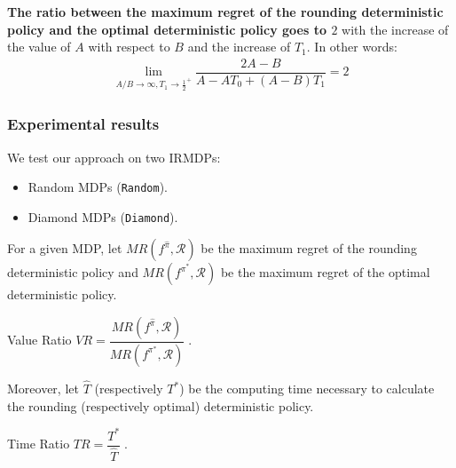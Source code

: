 \documentclass{beamer}
\begin{document}
\begin{frame}
\begin{columns}
\begin{column}{0.5\textwidth}
\begin{itemize}
\end{itemize} 



\end{column}
\end{columns}

\begin{block}{}
\begin{lemma}\label{lemma:gap2}
\textbf{The ratio between the maximum regret of the rounding deterministic policy and the optimal deterministic policy goes to $2$} with the increase of the value of $A$ with respect to $B$ and the increase of $T_1$. In other words:  
\begin{align*}
\lim_{A/B \rightarrow \infty, T_1 \rightarrow {\frac{1}{2}}^+} \dfrac{2A-B}{A- A T_0 +(A-B) T_1} = 2
\end{align*}
\end{lemma}

\end{block}

\end{frame}


\begin{frame}
\frametitle{Experimental results}

We test our approach on two IRMDPs:
\begin{itemize}
\item Random MDPs (\texttt{Random}).
\item Diamond MDPs (\texttt{Diamond}).
\end{itemize}

For a given MDP, let $MR(f^{\hat{\pi}}, \mathcal{R})$ be the maximum regret of the rounding deterministic policy and $MR(f^{\pi^*}, \mathcal{R})$  be the maximum regret of the optimal deterministic policy. 

\begin{block}{Value Ratio}
\center
$VR = \dfrac{MR(f^{\hat{\pi}}, \mathcal{R})}{MR(f^{\pi^*}, \mathcal{R})}\;$.
\end{block}

Moreover, let $\hat{T}$ (respectively $T^*$) be the computing time necessary to calculate the rounding (respectively optimal) deterministic policy.

\begin{block}{Time Ratio}
\center
$TR=\dfrac{T^*}{\hat{T}}\;$.
\end{block}





\end{frame}
\end{document}
